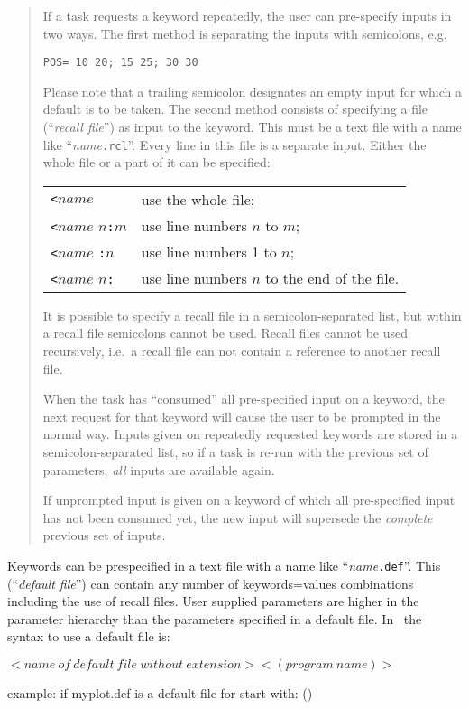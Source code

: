 \begin{quote}
\small
If a task requests a keyword repeatedly, the user can pre-specify inputs in
two ways. The first method is separating the inputs with semicolons,
e.g.

{\tt POS= 10 20; 15 25; 30 30}

Please note that a trailing semicolon
designates an empty input for which a default is to be taken.
The second method consists of specifying a file
(``{\em recall file\/}'') as input to the keyword.
This must be a text file  with a name like ``{\it name\/}{\tt .rcl}''.
Every line in this file is a separate input.
Either the whole file or a part of it can be specified:

\begin{tabular}{ll}
{\tt <}$name$&use the whole file;\\
{\tt <}$name$ $n${\tt:}$m$&use line numbers $n$ to $m$;\\
{\tt <}$name$ {\tt:}$n$&use line numbers 1 to $n$;\\
{\tt <}$name$ $n${\tt:}&use line numbers $n$ to the end of the file.\\
\end{tabular}

It is possible to specify a recall file in a semicolon-separated list, but
within a recall file semicolons cannot be used. Recall files cannot be used
recursively, i.e.\ a recall file can not contain a reference to another
recall file.

When the task has ``consumed'' all pre-specified input on a keyword, the next
request for that keyword will cause the user to be prompted in the normal way.
Inputs given on repeatedly requested keywords are stored in a 
semicolon-separated list, so if a task is re-run with the previous set of
parameters, {\em all\/} inputs are available again.

If unprompted input is given on a keyword of which all pre-specified input has
not been consumed yet, the new input will supersede the {\em complete\/}
previous set of inputs.
\end{quote}

Keywords can be prespecified in a text file with a name like 
``{\it name\/}{\tt .def}''. This (``{\em default file\/}'') can contain any number 
of keywords=values 
combinations including the use of recall files. User supplied parameters
are higher in the parameter hierarchy than the parameters specified in a
default file. In \tH\ the syntax to use a default file is:
\begin{center}
$<name\ of\ default\ file\ without\ extension><(program\ name)>$ 
\end{center}
example: if myplot.def is a default file for  start with: ()

